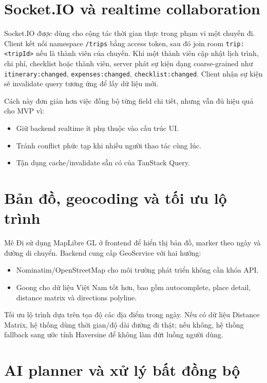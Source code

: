 \documentclass[a4paper]{report}
\newcommand{\ProjectName}{Mê Đi}
\begin{document}
\section{Socket.IO và realtime collaboration}

Socket.IO được dùng cho cộng tác thời gian thực trong phạm vi một chuyến đi. Client kết nối namespace \texttt{/trips} bằng access token, sau đó join room \texttt{trip:<tripId>} nếu là thành viên của chuyến. Khi một thành viên cập nhật lịch trình, chi phí, checklist hoặc thành viên, server phát sự kiện dạng coarse-grained như \texttt{itinerary:changed}, \texttt{expenses:changed}, \texttt{checklist:changed}. Client nhận sự kiện sẽ invalidate query tương ứng để lấy dữ liệu mới.

Cách này đơn giản hơn việc đồng bộ từng field chi tiết, nhưng vẫn đủ hiệu quả cho MVP vì:

\begin{itemize}
  \item Giữ backend realtime ít phụ thuộc vào cấu trúc UI.
  \item Tránh conflict phức tạp khi nhiều người thao tác cùng lúc.
  \item Tận dụng cache/invalidate sẵn có của TanStack Query.
\end{itemize}

\section{Bản đồ, geocoding và tối ưu lộ trình}

\ProjectName{} sử dụng MapLibre GL ở frontend để hiển thị bản đồ, marker theo ngày và đường di chuyển. Backend cung cấp GeoService với hai hướng:

\begin{itemize}
  \item Nominatim/OpenStreetMap cho môi trường phát triển không cần khóa API.
  \item Goong cho dữ liệu Việt Nam tốt hơn, bao gồm autocomplete, place detail, distance matrix và directions polyline.
\end{itemize}

Tối ưu lộ trình dựa trên tọa độ các địa điểm trong ngày. Nếu có dữ liệu Distance Matrix, hệ thống dùng thời gian/độ dài đường đi thật; nếu không, hệ thống fallback sang ước tính Haversine để không làm đứt luồng người dùng.

\section{AI planner và xử lý bất đồng bộ}
\end{document}
